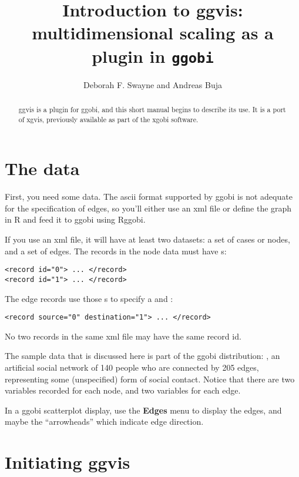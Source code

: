 \documentclass[11pt]{article}
\begin{document}
\title{Introduction to ggvis: multidimensional scaling as a plugin in {\tt ggobi}}
\author{Deborah F. Swayne and Andreas Buja}
\maketitle

\begin{abstract}
ggvis is a plugin for ggobi, and this short manual begins
to describe its use.  It is a port of xgvis,  previously
available as part of the xgobi software.
\end{abstract}

\section{The data}

First, you need some data.  The ascii format supported by ggobi is not
adequate for the specification of edges, so you'll either use an xml file
or define the graph in R and feed it to ggobi using Rggobi.

If you use an xml file, it will have at least two datasets: a set of
cases or nodes, and a set of edges.  The records in the node data must
have s:

\begin{verbatim}
<record id="0"> ... </record>
<record id="1"> ... </record>
\end{verbatim}

The edge records use those s to specify a
 and :

\begin{verbatim}
<record source="0" destination="1"> ... </record>
\end{verbatim}

No two records in the same xml file may have the same record id.

The sample data that is discussed here is part of the ggobi distribution:
, an artificial social network of 140 people who are
connected by 205 edges, representing some (unspecified) form of social
contact.  Notice that there are two variables recorded for each node,
and two variables for each edge.

In a ggobi scatterplot display, use the {\bf Edges} menu to
display the edges, and maybe the ``arrowheads'' which indicate
edge direction.

\section{Initiating ggvis}
\end{document}

